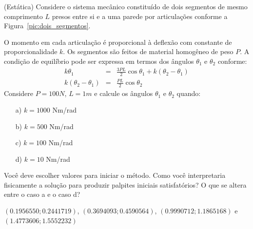 \begin{exer}{(Estática)}\label{prob:dois_segmentos} Considere o sistema mecânico constituído de dois segmentos de mesmo comprimento $L$ presos entre si e a uma parede por articulações conforme a Figura~\ref{pic:dois_segmentos}.

O momento em cada articulação é proporcional à deflexão com constante de proporcionalidade $k$. Os segmentos são feitos de material homogêneo de peso $P$. A condição de equilíbrio pode ser expressa em termos dos ângulos $\theta_1$ e $\theta_2$ conforme:
\begin{eqnarray*}
k\theta_1&=& \frac{3PL}{2}\cos\theta_1 + k\left(\theta_2-\theta_1\right)\\
k\left(\theta_2-\theta_1\right)&=& \frac{PL}{2}\cos\theta_2
\end{eqnarray*}
Considere $P=100N$, $L=1m$ e calcule os ângulos $\theta_1$ e $\theta_2$ quando:
\begin{itemize}
\item[a)] $k=1000$ Nm/rad
\item[b)] $k=500$ Nm/rad
\item[c)] $k=100$ Nm/rad
\item[d)] $k=10$ Nm/rad
\end{itemize}
Você deve escolher valores para iniciar o método. Como você interpretaria fisicamente a solução para produzir palpites iniciais satisfatórios? O que se altera entre o caso a e o caso d?
\end{exer}

\begin{resp}
$\left(0.1956550;0.2441719 \right)$, $\left(0.3694093;0.4590564\right) $, $\left( 0.9990712;1.1865168  \right)$ e $\left(1.4773606;1.5552232 \right)$
\end{resp}


